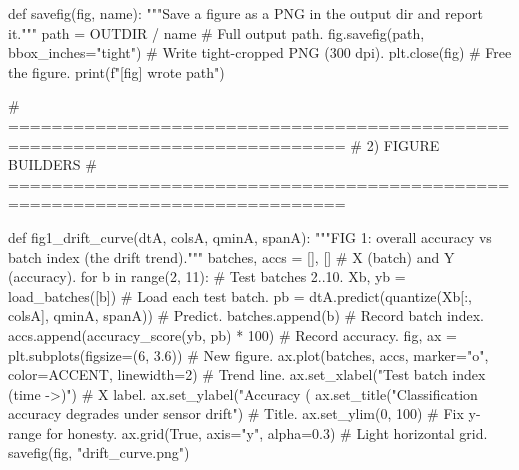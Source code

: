 def savefig(fig, name):
    """Save a figure as a PNG in the output dir and report it."""
    path = OUTDIR / name                            # Full output path.
    fig.savefig(path, bbox_inches="tight")          # Write tight-cropped PNG (300 dpi).
    plt.close(fig)                                  # Free the figure.
    print(f"[fig] wrote {path}")

# =============================================================================
# 2) FIGURE BUILDERS
# =============================================================================

def fig1_drift_curve(dtA, colsA, qminA, spanA):
    """FIG 1: overall accuracy vs batch index (the drift trend)."""
    batches, accs = [], []                          # X (batch) and Y (accuracy).
    for b in range(2, 11):                          # Test batches 2..10.
        Xb, yb = load_batches([b])                  # Load each test batch.
        pb = dtA.predict(quantize(Xb[:, colsA], qminA, spanA))  # Predict.
        batches.append(b)                           # Record batch index.
        accs.append(accuracy_score(yb, pb) * 100)   # Record accuracy.
    fig, ax = plt.subplots(figsize=(6, 3.6))        # New figure.
    ax.plot(batches, accs, marker="o", color=ACCENT, linewidth=2)  # Trend line.
    ax.set_xlabel("Test batch index (time ->)")     # X label.
    ax.set_ylabel("Accuracy (%
    ax.set_title("Classification accuracy degrades under sensor drift")  # Title.
    ax.set_ylim(0, 100)                             # Fix y-range for honesty.
    ax.grid(True, axis="y", alpha=0.3)              # Light horizontal grid.
    savefig(fig, "drift_curve.png")

